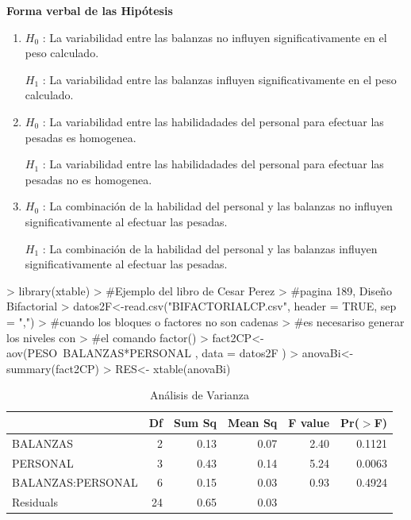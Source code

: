 \documentclass[12pt,letterpaper]{report}
\begin{document}
\textbf{Forma verbal de las Hipótesis}

\begin{enumerate}

\item $H_0$ : La variabilidad entre las balanzas no influyen significativamente en el peso calculado.

$H_1$ : La variabilidad entre las balanzas influyen significativamente en el peso calculado.

\item $H_0$ : La variabilidad entre las habilidadades del personal para efectuar las pesadas es homogenea.

$H_1$ : La variabilidad entre las habilidadades del personal para efectuar las pesadas no es homogenea.

\item $H_0$ : La combinación de la habilidad del personal y las balanzas no influyen significativamente al efectuar las pesadas.

$H_1$ : La combinación de la habilidad del personal y las balanzas influyen significativamente al efectuar las pesadas.
\end{enumerate}


\begin{Schunk}
\begin{Sinput}
> library(xtable)
> #Ejemplo del libro de Cesar Perez
> #pagina 189, Diseño Bifactorial
> datos2F<-read.csv("BIFACTORIALCP.csv", header = TRUE, sep = ",")
> #cuando los bloques o factores no son cadenas
> #es necesariso generar los niveles con
> #el comando factor()
> fact2CP<- aov(PESO~BALANZAS*PERSONAL , data = datos2F  )
> anovaBi<-summary(fact2CP)
> RES<- xtable(anovaBi)
\end{Sinput}
\end{Schunk}

\begin{table}[ht]
\centering
\begin{tabular}{lrrrrr}
  \hline
 & Df & Sum Sq & Mean Sq & F value & Pr($>$F) \\ 
  \hline
  BALANZAS          & 2 & 0.13 & 0.07 & 2.40 & 0.1121 \\ 
  PERSONAL          & 3 & 0.43 & 0.14 & 5.24 & 0.0063 \\ 
  BALANZAS:PERSONAL & 6 & 0.15 & 0.03 & 0.93 & 0.4924 \\ 
  Residuals         & 24 & 0.65 & 0.03 &  &  \\ 
   \hline
\end{tabular}
\caption{Análisis de Varianza}
\end{table}
\end{document}
